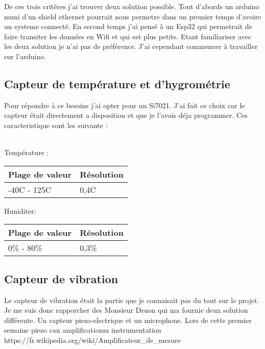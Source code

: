 \documentclass[5pt]{article}
\begin{document}
De ces trois critéres j'ai trouver deux solution possible. 
Tout d'abords un arduino muni d'un shield ethernet pourrait nous permetre dans un premier temps d'avoire un systeme connecté.
En second temps j'ai pensé à un Esp32 qui permetrait de faire transiter les données en Wifi et qui est plus petits. 
Etant familiariser avec les deux solution je n'ai pas de préférence. J'ai cependant commencer à travailler sur l'arduino.

\subsection{Capteur de température et d'hygrométrie }
Pour répondre à ce besoins j'ai opter pour un Si7021. J'ai fait ce choix car le capteur était directement a disposition et que je l'avais déja programmer. Ces caracteristique sont les suivante :

\\
Température :\\
\begin{center}
    \begin{tabular}{|l|l|}
	\hline
	    Plage de valeur & Résolution \\
	\hline
	    -40C - 125C & 0,4C \\
	\hline
    \end{tabular}
\end{center}


Huniditer:\\
\begin{center}
    \begin{tabular}{|l|l|}
	\hline
	    Plage de valeur & Résolution \\
	\hline
	    0\% - 80\% & 0,3\% \\
	\hline
    \end{tabular}
\end{center}

\subsection{Capteur de vibration}
Le capteur de vibration était la partie que je connaisait pas du tout sur le projet. Je me suis donc rapporcher des Monsieur Druon qui ma fournie deux solution différente. Un capteur piezo-electrique et un microphone. Lors de cette premier semaine 
piezo can amplificationm instrumentation
https://fr.wikipedia.org/wiki/Amplificateur\_de\_mesure

\end{document}
